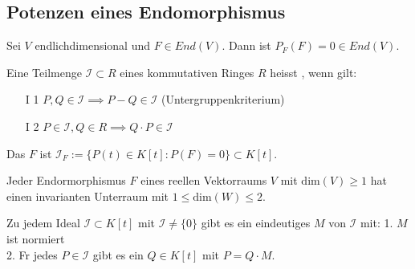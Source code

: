 \documentclass[8pt, a4paper, twocolumn, landscape]{article}
\begin{document}
\subsection{Potenzen eines Endomorphismus}
\begin{theorem}
 Sei $V$ endlichdimensional und $F \in End(V)$. Dann ist $P_F(F) = 0 \in End(V)$.
\end{theorem}
\begin{definition}
Eine Teilmenge $\mathcal{I} \subset R$ eines kommutativen Ringes $R$ heisst , wenn gilt:
\begin{enumerate}
\item[I 1] $P, Q \in \mathcal{I} \implies P - Q \in \mathcal{I}$ (Untergruppenkriterium)
\item[I 2] $P \in \mathcal{I}, Q \in R \implies Q \cdot P \in \mathcal{I}$
\end{enumerate}


\end{definition}

\begin{definition}
Das  $F$ ist $\mathcal{I}_F := \{ P(t) \in K[t] : P(F) = 0  \} \subset K[t]$.
\end{definition}

\begin{lemma}
Jeder Endormorphismus $F$ eines reellen Vektorraums $V$ mit $\mathrm{dim}(V) \geq 1$ hat einen invarianten Unterraum mit $1 \leq \mathrm{dim}(W) \leq 2$.
\end{lemma}





\begin{theorem}
Zu jedem Ideal $\mathcal{I} \subset K[t]$ mit $\mathcal{I} \neq \{0\}$ gibt es ein eindeutiges  $M$ von $\mathcal{I}$ mit: 1.
 $M$ ist normiert \\
2. F\uee r jedes $P \in \mathcal{I}$ gibt es ein $Q \in K[t]$ mit $P = Q \cdot M$.
\end{theorem}
\end{document}
